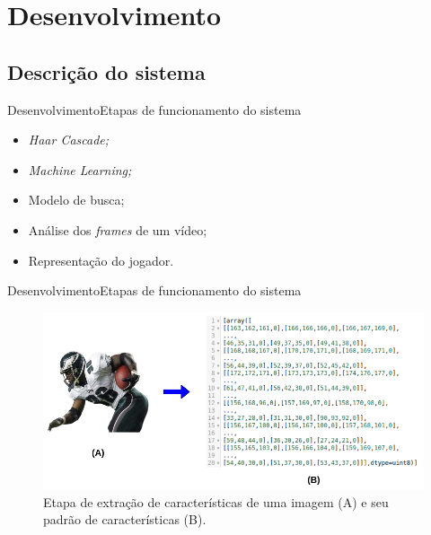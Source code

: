 \section{Desenvolvimento}
\subsection{Descrição do sistema}



\begin{frame}{Desenvolvimento}{Etapas de funcionamento do sistema}
\begin{itemize}
    \item<1> \textit{Haar Cascade;}
    \item<1> \textit{Machine Learning;}
    \item<1> Modelo de busca;
    \item<1> Análise dos \textit{frames} de um vídeo;
    \item<1> Representação do jogador.
\end{itemize}
\end{frame}

\begin{frame}{Desenvolvimento}{Etapas de funcionamento do sistema}
\begin{figure}
    \centering
    \caption{\label{fig_conversao_img}Etapa de extração de características de uma imagem (A) e seu padrão de características (B).}
    \includegraphics[scale=0.4]{05-SLIDES_DESENVOLVIMENTO/Imagens/conversao-de-imagem.png}
\end{figure}
\end{frame}

